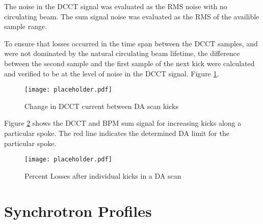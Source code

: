The noise in the DCCT signal was evaluated as the RMS noise with no circulating beam. The sum signal noise was evaluated as the RMS of the availible sample range.

To ensure that losses occurred in the time span between the DCCT samples, and were not dominated by the natural circulating beam lifetime, the difference between the second sample and the first sample of the next kick were calculated and verified to be at the level of noise in the DCCT signal. Figure \ref{fig:dcctKickLife}.


\begin{figure}
	\centering
	\texttt{[image: placeholder.pdf]}
	\caption{Change in DCCT current between DA scan kicks}
	\label{fig:dcctKickLife}
\end{figure}

Figure \ref{fig:daLimit} shows the DCCT and BPM sum signal for increasing kicks along a particular spoke. The red line indicates the determined DA limit for the particular spoke.

\begin{figure}
	\centering
	\texttt{[image: placeholder.pdf]}
	\caption{Percent Losses after individual kicks in a DA scan}
	\label{fig:daLimit}
\end{figure}

\section{Synchrotron Profiles} \label{sec:synchProfiles}
